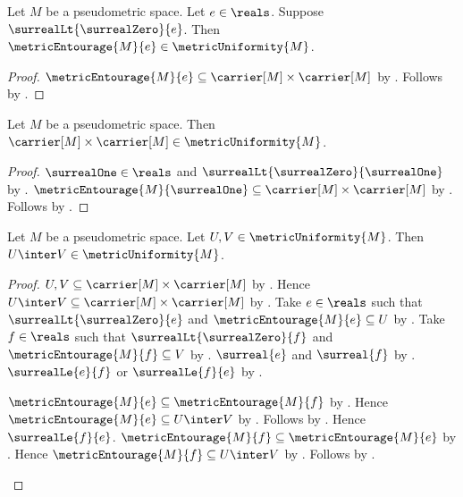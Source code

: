 \begin{proposition}\label{metric_entourage_is_entourage}
    Let $M$ be a pseudometric space.
    Let $e\in\reals$.
    Suppose $\surrealLt{\surrealZero}{e}$.
    Then $\metricEntourage{M}{e}\in\metricUniformity{M}$.
\end{proposition}
\begin{proof}
    $\metricEntourage{M}{e}
        \subseteq\carrier[M]\times\carrier[M]$
        by .
    Follows by
        .
\end{proof}

\begin{proposition}\label{metric_uniformity_top}
    Let $M$ be a pseudometric space.
    Then $\carrier[M]\times\carrier[M]\in\metricUniformity{M}$.
\end{proposition}
\begin{proof}
    $\surrealOne\in\reals$ and
        $\surrealLt{\surrealZero}{\surrealOne}$
        by .
    $\metricEntourage{M}{\surrealOne}
        \subseteq\carrier[M]\times\carrier[M]$
        by .
    Follows by
        .
\end{proof}

\begin{proposition}\label{metric_uniformity_intersection}
    Let $M$ be a pseudometric space.
    Let $U,V\in\metricUniformity{M}$.
    Then $U\inter V\in\metricUniformity{M}$.
\end{proposition}
\begin{proof}
    $U,V\subseteq\carrier[M]\times\carrier[M]$
        by .
    Hence $U\inter V\subseteq\carrier[M]\times\carrier[M]$
        by .
    Take $e\in\reals$ such that
        $\surrealLt{\surrealZero}{e}$ and
        $\metricEntourage{M}{e}\subseteq U$
        by .
    Take $f\in\reals$ such that
        $\surrealLt{\surrealZero}{f}$ and
        $\metricEntourage{M}{f}\subseteq V$
        by .
    $\surreal{e}$ and $\surreal{f}$
        by .
    $\surrealLe{e}{f}$ or $\surrealLe{f}{e}$
        by .
    \begin{byCase}
            $\metricEntourage{M}{e}\subseteq\metricEntourage{M}{f}$
                by .
            Hence $\metricEntourage{M}{e}\subseteq U\inter V$
                by .
            Follows by .
            Hence $\surrealLe{f}{e}$.
            $\metricEntourage{M}{f}\subseteq\metricEntourage{M}{e}$
                by .
            Hence $\metricEntourage{M}{f}\subseteq U\inter V$
                by .
            Follows by .
    \end{byCase}
\end{proof}

